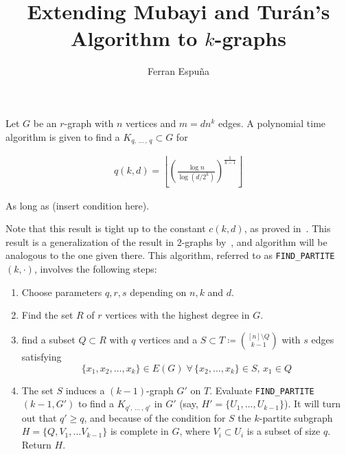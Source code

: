 \documentclass[12pt]{article}
\author{Ferran Espuña}
\date{} %
\begin{document}
    \title{Extending Mubayi and Turán's Algorithm to $k$-graphs}

    \maketitle

    Let $G$ be an $r$-graph with $n$ vertices and $m = dn^k$ edges.
    A polynomial time algorithm is given to find a $K_{q,\, \ldots\, ,\, q} \subset G$ for

    \begin{align*}
        q (k, d) = \left\lfloor \left(  \frac{\log n}{\log (d/2^k)} \right)^{\frac{1}{k-1}} \right\rfloor
        \label{eq:q}
    \end{align*}

    As long as (insert condition here). %
    
    Note that this result is tight up to the constant $c(k, d)$,
    as proved in~\cite{Erods1964}.
    This result is a generalization of the result in $2$-graphs by~\cite{MUBAYI2010174},
    and algorithm will be analogous to the one given there.
    This algorithm, referred to as \verb|FIND_PARTITE|$(k, \cdot)$, involves the following steps:

    \begin{enumerate}
        \item Choose parameters $q, r, s$ depending on $n, k$ and $d$. \label{step:choose_parameters}

        \item Find the set $R$ of $r$ vertices with the highest degree in $G$. \label{step:find_R}

        \item find a subset $Q \subset R$ with $q$ vertices and a
        $S \subset T \coloneqq \binom{[n] \setminus Q}{k-1}$ with $s$ edges satisfying
        \[\{x_1, x_2, \ldots, x_k\} \in E(G) \; \forall \, \{x_2, \ldots, x_k\} \in S, \, x_1 \in Q\] \label{step:find_Q_S}

        \item The set $S$ induces a $(k-1)$-graph $G'$ on $T$.
        Evaluate \verb|FIND_PARTITE|$(k-1, G')$ to find a $K_{q',\, \ldots\, ,\, q'}$ in $G'$
        (say, $H' = \{U_1, \ldots, U_{k-1}\}$). It will turn out that $q' \geq q$,
        and because of the condition for $S$ the $k$-partite subgraph $H = \{Q, V_1, \ldots V_{k-1}\}$
        is complete in $G$, where $V_i \subset U_i$ is a subset of size $q$.
        Return $H$.

    \end{enumerate}
\end{document}
